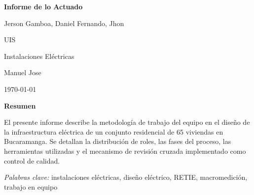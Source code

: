 \documentclass[12pt, letterpaper]{article}
\newcommand{\TituloTrabajo}{Informe de lo Actuado}
\newcommand{\NombreAutor}{%
  Jerson Gamboa, Daniel Fernando, Jhon}
\newcommand{\NombreInstitucion}{UIS}
\newcommand{\NombreCurso}{Instalaciones El\'ectricas}
\newcommand{\NombreProfesor}{Manuel Jose}
\newcommand{\FechaEntrega}{\today}
\begin{document}
\begin{titlepage}
  \begin{center}
    \vspace*{3cm}
    {\bfseries\TituloTrabajo\par}
    \vspace{1cm}
    \NombreAutor\par
    \vspace{0.5cm}
    \NombreInstitucion\par
    \NombreCurso\par
    \NombreProfesor\par
    \FechaEntrega\par
  \end{center}
\end{titlepage}

\newpage
\begin{center}
  \bfseries Resumen
\end{center}
\noindent
El presente informe describe la metodolog\'ia de trabajo del equipo
en el dise\~no de la infraestructura el\'ectrica de un conjunto
residencial de 65 viviendas en Bucaramanga. Se detallan la
distribuci\'on de roles, las fases del proceso, las herramientas
utilizadas y el mecanismo de revisi\'on cruzada implementado como
control de calidad.

\noindent\textit{Palabras clave:} instalaciones el\'ectricas,
dise\~no el\'ectrico, RETIE, macromedici\'on, trabajo en equipo

\newpage


\nocite{*}
\newpage


\end{document}
